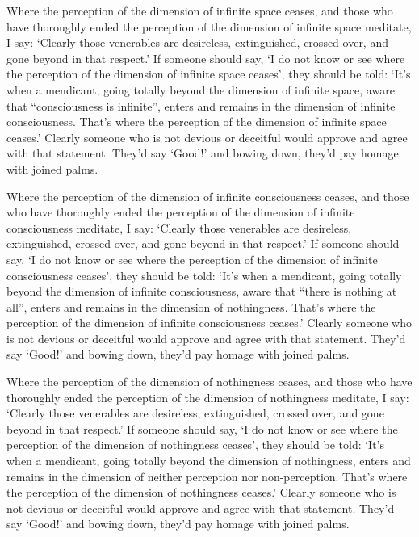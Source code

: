 \documentclass[12pt,openany]{book}%
\begin{document}
Where the perception of the dimension of infinite space ceases, and those who have thoroughly ended the perception of the dimension of infinite space meditate, I say: ‘Clearly those venerables are desireless, extinguished, crossed over, and gone beyond in that respect.’ If someone should say, ‘I do not know or see where the perception of the dimension of infinite space ceases’, they should be told: ‘It’s when a mendicant, going totally beyond the dimension of infinite space, aware that “consciousness is infinite”, enters and remains in the dimension of infinite consciousness. That’s where the perception of the dimension of infinite space ceases.’ Clearly someone who is not devious or deceitful would approve and agree with that statement. They’d say ‘Good!’ and bowing down, they’d pay homage with joined palms. 

Where the perception of the dimension of infinite consciousness ceases, and those who have thoroughly ended the perception of the dimension of infinite consciousness meditate, I say: ‘Clearly those venerables are desireless, extinguished, crossed over, and gone beyond in that respect.’ If someone should say, ‘I do not know or see where the perception of the dimension of infinite consciousness ceases’, they should be told: ‘It’s when a mendicant, going totally beyond the dimension of infinite consciousness, aware that “there is nothing at all”, enters and remains in the dimension of nothingness. That’s where the perception of the dimension of infinite consciousness ceases.’ Clearly someone who is not devious or deceitful would approve and agree with that statement. They’d say ‘Good!’ and bowing down, they’d pay homage with joined palms. 

Where the perception of the dimension of nothingness ceases, and those who have thoroughly ended the perception of the dimension of nothingness meditate, I say: ‘Clearly those venerables are desireless, extinguished, crossed over, and gone beyond in that respect.’ If someone should say, ‘I do not know or see where the perception of the dimension of nothingness ceases’, they should be told: ‘It’s when a mendicant, going totally beyond the dimension of nothingness, enters and remains in the dimension of neither perception nor non-perception. That’s where the perception of the dimension of nothingness ceases.’ Clearly someone who is not devious or deceitful would approve and agree with that statement. They’d say ‘Good!’ and bowing down, they’d pay homage with joined palms. 
\end{document}
